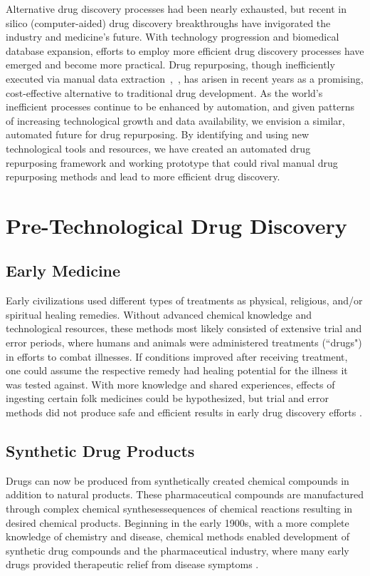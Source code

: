 \documentclass{IEEEtran}
\begin{document}
		Alternative drug discovery processes had been nearly exhausted, but recent in silico (computer-aided) drug discovery breakthroughs have invigorated the industry and medicine's future.  With technology progression and biomedical database expansion, efforts to employ more efficient drug discovery processes have emerged and become more practical. Drug repurposing, though inefficiently executed via manual data extraction~\cite{zhang15},~\cite{zhang16}, has arisen in recent years as a promising, cost-effective alternative to traditional drug development. As the world's inefficient processes continue to be enhanced by automation, and given patterns of increasing technological growth and data availability, we envision a similar, automated future for drug repurposing. By identifying and using  new technological tools and resources, we have created an automated drug repurposing framework and working prototype that could rival manual drug repurposing methods and lead to more efficient drug discovery. 
	
		\section{Pre-Technological Drug Discovery}
		\subsection{Early Medicine}
		Early civilizations used different types of treatments as physical, religious, and/or spiritual healing remedies.  Without advanced chemical knowledge and technological resources, these methods most likely consisted of extensive trial and error periods, where humans and animals were administered treatments (``drugs") in efforts to combat illnesses.  If conditions improved after receiving treatment, one could assume the respective remedy had healing potential for the illness it was tested against.  With more knowledge and shared experiences, effects of ingesting certain folk medicines could be hypothesized, but trial and error methods did not produce safe and efficient results in early drug discovery efforts \cite{ng}. 
		\subsection{Synthetic Drug Products}
		Drugs can now be produced from synthetically created chemical compounds in addition to natural products.  These pharmaceutical compounds are manufactured through complex chemical syntheses\textemdash sequences of chemical reactions resulting in desired chemical products.  Beginning in the early 1900s, with a more complete knowledge of chemistry and disease, chemical methods enabled development of synthetic drug compounds and the pharmaceutical industry, where many early drugs provided therapeutic relief from disease symptoms \cite{ng}.
\end{document}
